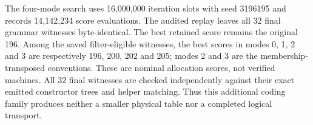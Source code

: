The four-mode search uses 16,000,000 iteration slots with seed 3196195 and
records 14,142,234 score evaluations. The audited replay leaves all 32
final grammar witnesses byte-identical.
The best retained score remains the original 196. Among the saved
filter-eligible witnesses, the best scores in modes 0, 1, 2 and 3 are
respectively 196, 200, 202 and 205; modes 2 and 3 are the membership-transposed
conventions. These are nominal allocation scores, not verified machines.
All 32 final witnesses are checked independently against their exact emitted
constructor trees and helper matching. Thus this additional coding family
produces neither a smaller physical table nor a completed logical transport.
